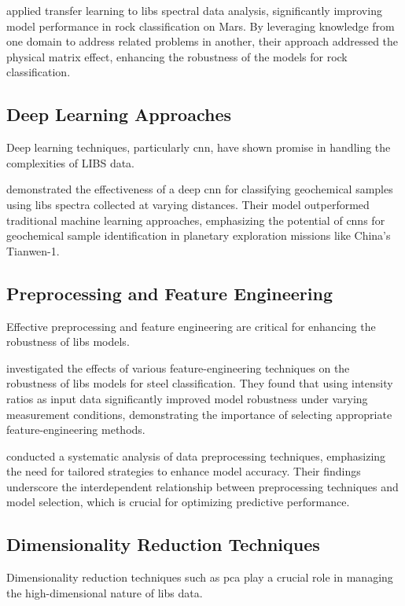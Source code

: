 \citet{sunMachineLearningTransfer2021} applied transfer learning to \gls{libs} spectral data analysis, significantly improving model performance in rock classification on Mars.
By leveraging knowledge from one domain to address related problems in another, their approach addressed the physical matrix effect, enhancing the robustness of the models for rock classification.

\subsection{Deep Learning Approaches}
Deep learning techniques, particularly \gls{cnn}, have shown promise in handling the complexities of LIBS data.

\citet{yangConvolutionalNeuralNetwork2022} demonstrated the effectiveness of a deep \gls{cnn} for classifying geochemical samples using \gls{libs} spectra collected at varying distances.
Their model outperformed traditional machine learning approaches, emphasizing the potential of \gls{cnn}s for geochemical sample identification in planetary exploration missions like China's Tianwen-1.

\subsection{Preprocessing and Feature Engineering}
Effective preprocessing and feature engineering are critical for enhancing the robustness of \gls{libs} models.

\citet{jeonEffectsFeatureEngineering2024} investigated the effects of various feature-engineering techniques on the robustness of \gls{libs} models for steel classification.
They found that using intensity ratios as input data significantly improved model robustness under varying measurement conditions, demonstrating the importance of selecting appropriate feature-engineering methods.

\citet{Huang2015AnEA} conducted a systematic analysis of data preprocessing techniques, emphasizing the need for tailored strategies to enhance model accuracy.
Their findings underscore the interdependent relationship between preprocessing techniques and model selection, which is crucial for optimizing predictive performance.

\subsection{Dimensionality Reduction Techniques}
Dimensionality reduction techniques such as \gls{pca} play a crucial role in managing the high-dimensional nature of \gls{libs} data.

